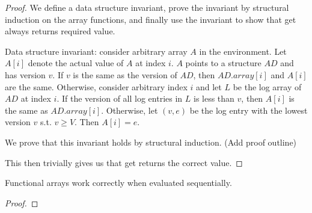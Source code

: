 \documentclass[preprint]{sigplanconf}
\begin{document}
\begin{proof} 
We define a data structure invariant, prove the invariant by structural induction on the array functions, and finally use the invariant to show that get always returns required value.

Data structure invariant: consider arbitrary array $A$ in the environment. Let $A[i]$ denote the actual value of $A$ at index $i$. $A$ points to a structure $AD$ and has version $v$. If $v$ is the same as the version of $AD$, then $AD.array[i]$ and $A[i]$ are the same. Otherwise, consider arbitrary index $i$ and let $L$ be the log array of $AD$ at index $i$. If the version of all log entries in $L$ is less than $v$, then $A[i]$ is the same as $AD.array[i]$. Otherwise, let $(v,e)$ be the log entry with the lowest version $v$ s.t. $v \geq V$. Then $A[i] = e$.

We prove that this invariant holds by structural induction. (Add proof outline)

This then trivially gives us that get returns the correct value.

\end{proof}

\begin{lemma}
Functional arrays work correctly when evaluated sequentially.
\end{lemma}

\begin{proof}

\end{proof}







\end{document}

